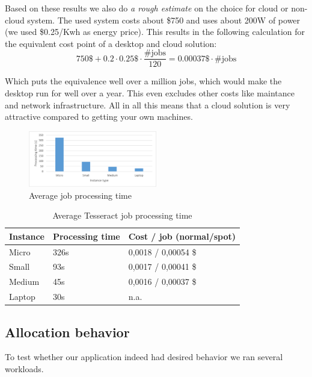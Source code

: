 \documentclass[a4paper]{IEEEtran}
\begin{document}
Based on these results we also do \emph{a rough estimate} on the choice for cloud or non-cloud system. The used system costs about \$750 and uses about 200W of power (we used \$0.25/Kwh as energy price). This results in the following calculation for the equivalent cost point of a desktop and cloud solution:
$$
750\$ + 0.2 \cdot 0.25\$ \cdot \frac{\text{\#jobs}}{120} = 0.00037\$ \cdot \text{\#jobs}
$$

Which puts the equivalence well over a million jobs, which would make the desktop run for well over a year. This even excludes other costs like maintance and network infrastructure. All in all this means that a cloud solution is very attractive compared to getting your own machines.

\begin{figure}
\centering
\includegraphics[width=0.5\textwidth]{"results-tesseract"}
\caption{Average job processing time}
\label{fig_tesperfresults}
\end{figure}

\begin{table}
\caption{Average Tesseract job processing time}
\label{tesperfresults}
\centering
\begin{tabular}{| l | l | l |}
\hline
Instance & Processing time & Cost / job (normal/spot) \\ \hline
Micro & 326s & 0,0018 / 0,00054 \$ \\ \hline
Small & 93s & 0,0017 / 0,00041 \$ \\ \hline
Medium & 45s & 0,0016 / 0,00037 \$ \\ \hline
Laptop & 30s & n.a. \\ \hline
\end{tabular}
\end{table}

\subsection{Allocation behavior}

To test whether our application indeed had desired behavior we ran several workloads.
\end{document}
